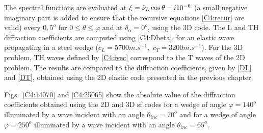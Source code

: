 The spectral functions are evaluated at $\xi=\tilde{\nu}_L\cos\theta -i10^{-6}$ (a small negative imaginary part is added to ensure that the recursive equations \eqref{C4:recur} are valid) every $0,5^o$ for $0\leq\theta\leq \varphi$ and at $\delta_{\alpha} =0^o$,  using the 3D code. The L and TH diffraction coefficients are computed using \eqref{C4:Dbeta}, for an elastic wave propagating in a steel wedge ($c_L=5700m.s^{-1}, \, \, c_T=3200m.s^{-1}$). For the 3D problem, TH waves defined by \eqref{C4:ivec} correspond to the T waves of the 2D problem. The results are compared to the diffraction coefficients, given by \eqref{DL} and \eqref{DT}, obtained using the 2D elastic code presented in the previous chapter.

Figs.~\ref{C4:14070} and \ref{C4:25065} show the absolute value of the diffraction coefficients obtained using the 2D and 3D \acrshort{sf} codes for a wedge of angle $\varphi=140^o$ illuminated by a wave incident with an angle $\theta_{inc}=70^o$ and for a wedge of angle $\varphi=250^o$ illuminated by a wave incident with an angle $\theta_{inc}=65^o$.

